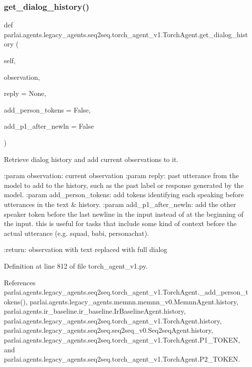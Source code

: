 \subsubsection{\texorpdfstring{get\+\_\+dialog\+\_\+history()}{get\_dialog\_history()}}
{\footnotesize\ttfamily def parlai.\+agents.\+legacy\+\_\+agents.\+seq2seq.\+torch\+\_\+agent\+\_\+v1.\+Torch\+Agent.\+get\+\_\+dialog\+\_\+history (\begin{DoxyParamCaption}\item[{}]{self,  }\item[{}]{observation,  }\item[{}]{reply = {\ttfamily None},  }\item[{}]{add\+\_\+person\+\_\+tokens = {\ttfamily False},  }\item[{}]{add\+\_\+p1\+\_\+after\+\_\+newln = {\ttfamily False} }\end{DoxyParamCaption})}

\begin{DoxyVerb}Retrieve dialog history and add current observations to it.

:param observation:        current observation
:param reply:              past utterance from the model to add to the
                   history, such as the past label or response
                   generated by the model.
:param add_person_tokens:  add tokens identifying each speaking before
                   utterances in the text & history.
:param add_p1_after_newln: add the other speaker token before the last
                   newline in the input instead of at the
                   beginning of the input. this is useful for
                   tasks that include some kind of context
                   before the actual utterance (e.g. squad,
                   babi, personachat).

:return: observation with text replaced with full dialog
\end{DoxyVerb}
 

Definition at line 812 of file torch\+\_\+agent\+\_\+v1.\+py.



References parlai.\+agents.\+legacy\+\_\+agents.\+seq2seq.\+torch\+\_\+agent\+\_\+v1.\+Torch\+Agent.\+\_\+add\+\_\+person\+\_\+tokens(), parlai.\+agents.\+legacy\+\_\+agents.\+memnn.\+memnn\+\_\+v0.\+Memnn\+Agent.\+history, parlai.\+agents.\+ir\+\_\+baseline.\+ir\+\_\+baseline.\+Ir\+Baseline\+Agent.\+history, parlai.\+agents.\+legacy\+\_\+agents.\+seq2seq.\+torch\+\_\+agent\+\_\+v1.\+Torch\+Agent.\+history, parlai.\+agents.\+legacy\+\_\+agents.\+seq2seq.\+seq2seq\+\_\+v0.\+Seq2seq\+Agent.\+history, parlai.\+agents.\+legacy\+\_\+agents.\+seq2seq.\+torch\+\_\+agent\+\_\+v1.\+Torch\+Agent.\+P1\+\_\+\+T\+O\+K\+EN, and parlai.\+agents.\+legacy\+\_\+agents.\+seq2seq.\+torch\+\_\+agent\+\_\+v1.\+Torch\+Agent.\+P2\+\_\+\+T\+O\+K\+EN.



